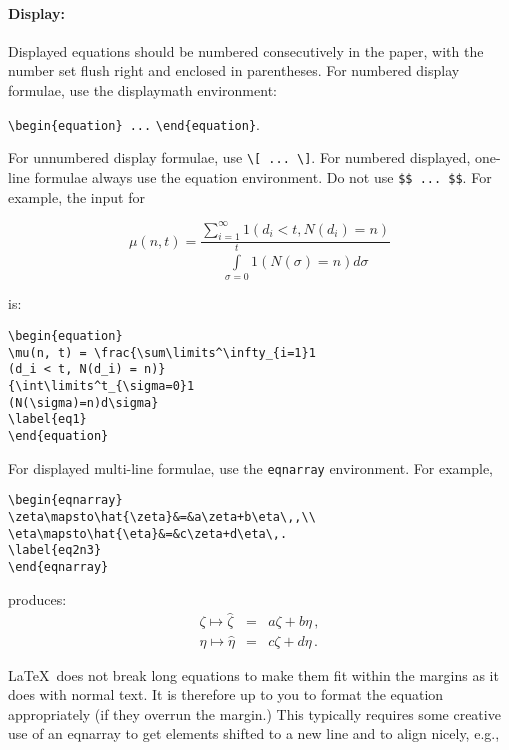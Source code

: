 \documentclass{ws-bme}
\begin{document}
\begin{multicols}{2}
\paragraph{Display:}
Displayed equations should be numbered consecutively in
the paper, with the number set flush right and enclosed in
parentheses. For numbered display formulae, use the displaymath
environment:

\verb|\begin{equation} ...| \verb|\end{equation}|.

For unnumbered display formulae, use
\verb|\[ ... \]|. For numbered displayed,
one-line formulae always use the equation environment. Do not use
\verb|$$ ... $$|. For example, the input for

\begin{equation}
\mu(n, t) = \frac{\sum\limits^\infty_{i=1}1
(d_i < t, N(d_i) = n)}
{\int\limits^t_{\sigma=0}1(N(\sigma)=n)d\sigma}
\label{eq1}
\end{equation}

\noindent is:

\begin{verbatim}
\begin{equation}
\mu(n, t) = \frac{\sum\limits^\infty_{i=1}1
(d_i < t, N(d_i) = n)}
{\int\limits^t_{\sigma=0}1
(N(\sigma)=n)d\sigma}
\label{eq1}
\end{equation}
\end{verbatim}

For displayed multi-line formulae, use the \verb|eqnarray| environment. For example,

\begin{verbatim}
\begin{eqnarray}
\zeta\mapsto\hat{\zeta}&=&a\zeta+b\eta\,,\\
\eta\mapsto\hat{\eta}&=&c\zeta+d\eta\,.
\label{eq2n3}
\end{eqnarray}
\end{verbatim}

\noindent produces:
\begin{eqnarray}
\zeta\mapsto\hat{\zeta}&=&a\zeta+b\eta\,,\\
\eta\mapsto\hat{\eta}&=&c\zeta+d\eta\,.
\label{eq2n3}
\end{eqnarray}

\LaTeX\ does not break long equations to make them fit within the
margins as it does with normal text. It is therefore up to you to
format the equation appropriately (if they overrun the margin.) This
typically requires some creative use of an eqnarray to get elements
shifted to a new line and to align nicely, e.g.,


\end{multicols}
\end{document}
